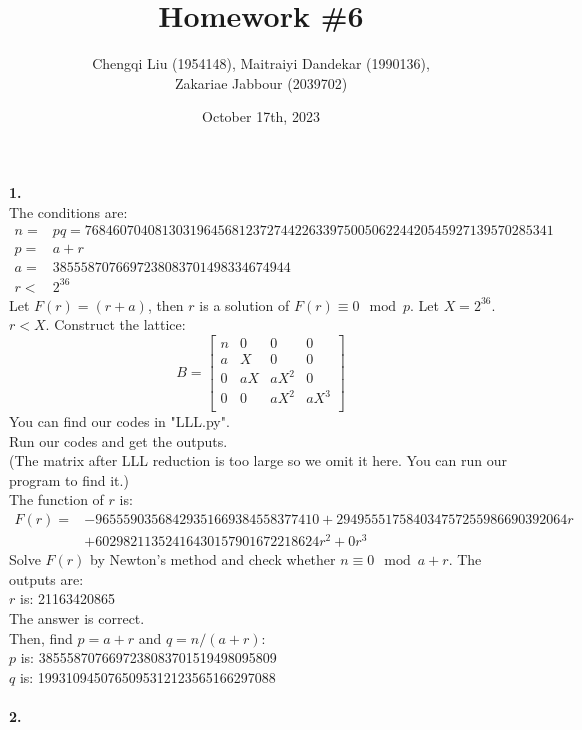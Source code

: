 \documentclass[
12pt, %
]{fphw}
\title{Homework \#6} %
\author{Chengqi Liu (1954148), Maitraiyi Dandekar (1990136),\\ Zakariae Jabbour (2039702)} %
\date{October 17th, 2023} %
\institute{Eindhoven University of Technology} %
\begin{document}
\maketitle %

\textbf{1.\\}
The conditions are:
\begin{align*}
	n=&pq=7684607040813031964568123727442263397500506224420545927139570285341\\
	p=&a+r\\
	a=&3855587076697238083701498334674944\\
	r<&2^{36}
\end{align*}
Let $F(r)=(r+a)$, then $r$ is a solution of $F(r)\equiv0\mod p$. Let $X=2^{36}$. $r<X$. Construct the lattice:
\[B=
\begin{bmatrix}
	n & 0 & 0 & 0\\
	a & X & 0 & 0\\
	0 & aX & aX^2 & 0\\
	0 & 0 & aX^2 & aX^3\\
\end{bmatrix}
\]
You can find our codes in "LLL.py".\\
Run our codes and get the outputs.\\
(The matrix after LLL reduction is too large so we omit it here. You can run our program to find it.)\\
The function of $r$ is:
\begin{align*}
	F(r)=&-96555903568429351669384558377410+294955517584034757255986690392064r\\
	&+60298211352416430157901672218624r^2+0r^3
\end{align*}
Solve $F(r)$ by Newton's method and check whether $n\equiv 0 \mod a+r$. The outputs are:\\
$r$ is: 21163420865\\
The answer is correct.\\
Then, find $p=a+r$ and $q=n/(a+r)$:\\ 
$p$ is: 3855587076697238083701519498095809\\
$q$ is: 1993109450765095312123565166297088\\\\
\textbf{2.\\}
\end{document}
